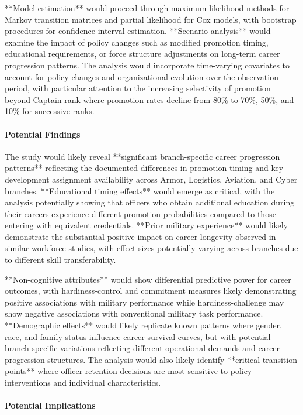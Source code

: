 \documentclass[main.tex]{subfiles}
\begin{document}
**Model estimation** would proceed through maximum likelihood methods for Markov transition matrices and partial likelihood for Cox models, with bootstrap procedures for confidence interval estimation. **Scenario analysis** would examine the impact of policy changes such as modified promotion timing, educational requirements, or force structure adjustments on long-term career progression patterns. The analysis would incorporate time-varying covariates to account for policy changes and organizational evolution over the observation period, with particular attention to the increasing selectivity of promotion beyond Captain rank where promotion rates decline from 80\% to 70\%, 50\%, and 10\% for successive ranks.

\paragraph{Potential Findings}

The study would likely reveal **significant branch-specific career progression patterns** reflecting the documented differences in promotion timing and key development assignment availability across Armor, Logistics, Aviation, and Cyber branches. **Educational timing effects** would emerge as critical, with the analysis potentially showing that officers who obtain additional education during their careers experience different promotion probabilities compared to those entering with equivalent credentials. **Prior military experience** would likely demonstrate the substantial positive impact on career longevity observed in similar workforce studies, with effect sizes potentially varying across branches due to different skill transferability.

**Non-cognitive attributes** would show differential predictive power for career outcomes, with hardiness-control and commitment measures likely demonstrating positive associations with military performance while hardiness-challenge may show negative associations with conventional military task performance. **Demographic effects** would likely replicate known patterns where gender, race, and family status influence career survival curves, but with potential branch-specific variations reflecting different operational demands and career progression structures. The analysis would also likely identify **critical transition points** where officer retention decisions are most sensitive to policy interventions and individual characteristics.

\paragraph{Potential Implications}
\end{document}
